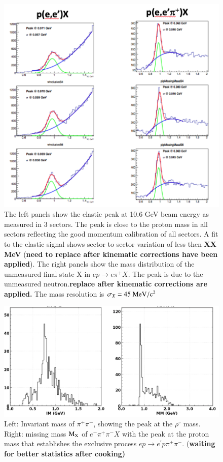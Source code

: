 \documentclass[final,3p,times,twocolumn,authoryear]{elsarticle}
\begin{document}
\begin{figure}[htbp!]
\centerline{\includegraphics[width=1.0\columnwidth]{elastic_pi+n.png}}
\caption{ The left panels show the elastic peak at 10.6 GeV beam energy as measured in 3 sectors. The peak is close to the proton mass 
in all sectors reflecting the good momentum calibration of all sectors. A fit to the elastic signal shows sector to sector variation of less 
then {\bf XX MeV} ({\bf need to replace after kinematic corrections have been applied}). The right panels show the mass distribution of 
the unmeasured final state X in $ep \to e\pi^+ X$. The peak is due to the unmeasured neutron.{\bf replace after kinematic corrections 
are applied.} The mass resolution is $\sigma_X = \rm 45~MeV/c^2$} 
\label{elastic-peak}
\end{figure} 

\begin{figure}[htbp!]
\centerline{\includegraphics[width=1.0\columnwidth]{pip-pim-p.png}}
\caption{Left: Invariant mass of $\pi^+\pi^-$, showing the peak at the $\rho^\circ$ mass. Right: missing mass 
$\rm M_X$  of $e^-\pi^+\pi^-X$ 
with the peak at the proton mass that establishes the exclusive process $ep\to e^\prime p \pi^+\pi^-$. ({\bf waiting for better statistics after cooking)}}
\label{pip-pim-p}
\end{figure} 
\end{document}
